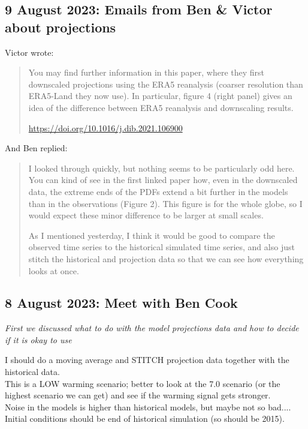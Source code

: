 \documentclass[11pt,letter]{article}
\begin{document}
\subsection{9 August 2023: Emails from Ben \& Victor about projections}

Victor wrote:
\begin{quote}
You may find further information in this paper, where they first downscaled projections using the ERA5 reanalysis (coarser resolution than ERA5-Land they now use).
In particular, figure 4 (right panel) gives an idea of the difference between ERA5 reanalysis and downscaling results.

\url{https://doi.org/10.1016/j.dib.2021.106900}
\end{quote}

And Ben replied:
\begin{quote}
I looked through quickly, but nothing seems to be particularly odd here. You can kind of see in the first linked paper how, even in the downscaled data, the extreme ends of the PDFs extend a bit further in the models than in the observations (Figure 2). This figure is for the whole globe, so I would expect these minor difference to be larger at small scales.

As I mentioned yesterday, I think it would be good to compare the observed time series to the historical simulated time series, and also just stitch the historical and projection data so that we can see how everything looks at once. 
\end{quote}


\subsection{8 August 2023: Meet with Ben Cook}

\emph{First we discussed what to do with the model projections data and how to decide if it is okay to use}

I should do a moving average and STITCH projection data together with the historical data. \\

This is a LOW warming scenario; better to look at the 7.0 scenario (or the highest scenario we can get) and see if the warming signal gets stronger. \\

Noise in the models is higher than historical models, but maybe not so bad.... \\

Initial conditions should be end of historical simulation (so should be 2015). \\
\end{document}
